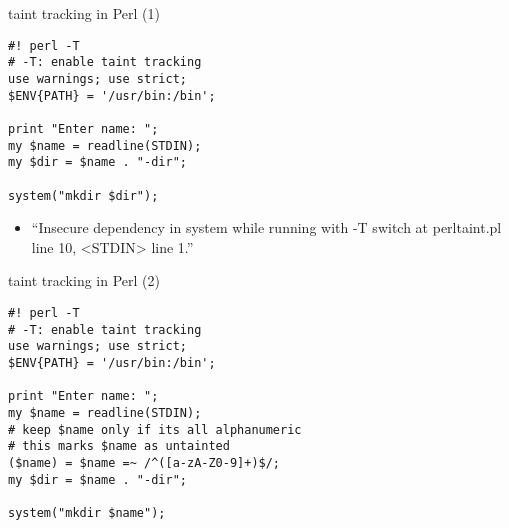 \begin{frame}[fragile,label=perlTT1]{taint tracking in Perl (1)}
    \begin{verbatim}
#! perl -T
# -T: enable taint tracking
use warnings; use strict;
$ENV{PATH} = '/usr/bin:/bin';

print "Enter name: ";
my $name = readline(STDIN);
my $dir = $name . "-dir";

system("mkdir $dir");
\end{verbatim}
    \begin{itemize}
    \item ``Insecure dependency in system while running with -T switch at perltaint.pl line 10, <STDIN> line 1.''
    \end{itemize}
\end{frame}

\begin{frame}[fragile,label=perlTT2]{taint tracking in Perl (2)}
\begin{verbatim}
#! perl -T
# -T: enable taint tracking
use warnings; use strict;
$ENV{PATH} = '/usr/bin:/bin';

print "Enter name: ";
my $name = readline(STDIN);
# keep $name only if its all alphanumeric
# this marks $name as untainted
($name) = $name =~ /^([a-zA-Z0-9]+)$/;
my $dir = $name . "-dir";

system("mkdir $name");
\end{verbatim}
\end{frame}


